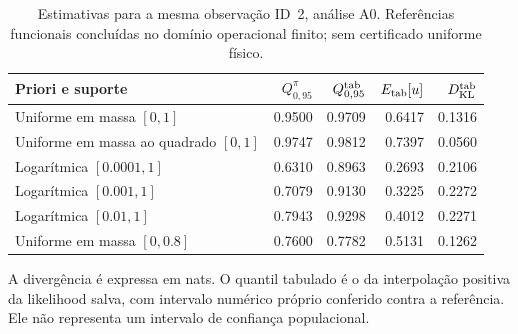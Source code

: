 \begin{table}[htbp]
\centering\small
\caption{Estimativas para a mesma observação ID~2, análise A0. Referências funcionais concluídas no domínio operacional finito; sem certificado uniforme físico.}
\label{tab:d2-prioris-concluidas}
\begin{tabular}{@{}lrrrr@{}}\toprule
Priori e suporte & $Q_{0,95}^{\pi}$ & $Q_{0,95}^{\rm tab}$ & $E_{\rm tab}[u]$ & $D_{\rm KL}^{\rm tab}$ \\
\midrule
Uniforme em massa $[0,1]$ & 0.9500 & 0.9709 & 0.6417 & 0.1316 \\
Uniforme em massa ao quadrado $[0,1]$ & 0.9747 & 0.9812 & 0.7397 & 0.0560 \\
Logarítmica $[0.0001,1]$ & 0.6310 & 0.8963 & 0.2693 & 0.2106 \\
Logarítmica $[0.001,1]$ & 0.7079 & 0.9130 & 0.3225 & 0.2272 \\
Logarítmica $[0.01,1]$ & 0.7943 & 0.9298 & 0.4012 & 0.2271 \\
Uniforme em massa $[0,0.8]$ & 0.7600 & 0.7782 & 0.5131 & 0.1262 \\
\bottomrule\end{tabular}
\end{table}
\noindent A divergência é expressa em nats. O quantil tabulado é o da interpolação positiva da likelihood salva, com intervalo numérico próprio conferido contra a referência. Ele não representa um intervalo de confiança populacional.
